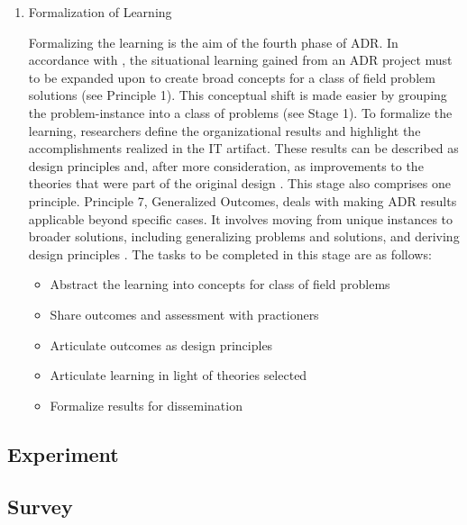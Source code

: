 {\begin{enumerate}
\begin{itemize}
        \item Reflect on the design and redesign during the project
        \item Evaluate adherence to principles
        \item Analyze intervention results according to stated goals
\end{itemize}
        \item Formalization of Learning
\par{Formalizing the learning is the aim of the fourth phase of ADR. In accordance with \cite{aken2004management}, the situational learning gained from an ADR project must to be expanded upon to create broad concepts for a class of field problem solutions (see Principle 1). This conceptual shift is made easier by grouping the problem-instance into a class of problems (see Stage 1). To formalize the learning, researchers define the organizational results and highlight the accomplishments realized in the IT artifact. These results can be described as design principles and, after more consideration, as improvements to the theories that were part of the original design \citep{sein2011action}. This stage also comprises one principle. Principle 7, Generalized Outcomes, deals with making ADR results applicable beyond specific cases. It involves moving from unique instances to broader solutions, including generalizing problems and solutions, and deriving design principles \citep{sein2011action}. The tasks to be completed in this stage are as follows:}
\begin{itemize}
        \item Abstract the learning into concepts for class of field problems
        \item Share outcomes and assessment with practioners
        \item Articulate outcomes as design principles
        \item Articulate learning in light of theories selected
        \item Formalize results for dissemination
\end{itemize}
\end{enumerate}}
\subsection{Experiment}
\subsection{Survey}
